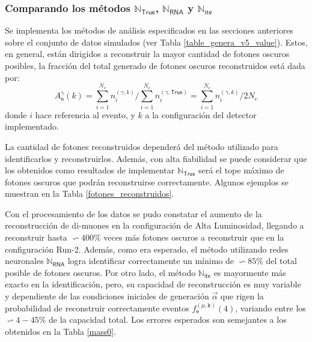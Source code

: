 \subsubsection{Comparando los métodos $\mathbb{N}_\textsf{True}$, $\mathbb{N}_\textsf{RNA}$ y $\mathbb{N}_\textsf{ite}$}
Se implementa los métodos de análisis especificados en las secciones anteriores sobre el conjunto de datos simulados (ver Tabla \ref{table_genera_v5_value}). Estos, en general, están dirigidos a reconstruir la mayor cantidad de fotones oscuros posibles, la fracción del total generado de fotones oscuros reconstruidos está dada por:
\begin{equation}
A_\textsf{n}^{\gamma} (k) = {\sum\limits_{i=1}^{N_e} n_i^{(\gamma,k)}}/{\sum\limits_{i=1}^{N_e} n_i^{(\gamma,\textsf{True})}} = {\sum\limits_{i=1}^{N_e} n_i^{(\gamma,k)}}/2 N_e 
\end{equation}
donde $i$ hace referencia al evento, y $k$ a la configuración del detector implementado. 

La cantidad de fotones reconstruidos dependerá del método utilizado para identificarlos y reconstruirlos. Además, con alta fiabilidad se puede considerar que los obtenidos como resultados de implementar $\mathbb{N}_\textsf{True}$ será el tope máximo de fotones oscuros que podrán reconstruirse correctamente. Algunos ejemplos se muestran en la Tabla \ref{fotones_reconstruidos}.

Con el procesamiento de los datos se pudo constatar el aumento de la reconstrucción de di-muones en la configuración de Alta Luminosidad, llegando a reconstruir hasta $\backsim 400\%$ veces más fotones oscuros a reconstruir que en la configuración Run-2. Además, como era esperado, el método utilizando redes neuronales $\mathbb{N}_\textsf{RNA}$ logra identificar correctamente un mínimo de $\backsim 85\%$ del total posible de fotones oscuros. Por otro lado, el método $\mathbb{N}_\textsf{ite}$ es mayormente más exacto en la identificación, pero, su capacidad de reconstrucción es muy variable y dependiente de las condiciones iniciales de generación $\vec{\alpha}$ que rigen la probabilidad de reconstruir correctamente eventos $f^{(\mu, \texttt{k})}_\textsf{e} (4)$, variando entre los $\backsim 4-45\%$ de la capacidad total. Los errores esperados son semejantes a los obtenidos en la Tabla \ref{mass0}.










